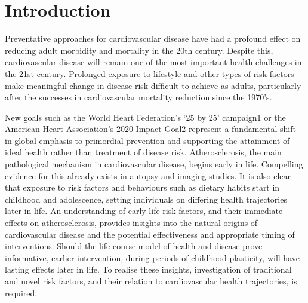 \section{Introduction}
Preventative approaches for cardiovascular disease have had a profound effect on reducing adult morbidity and mortality in the 20th century. Despite this, cardiovascular disease will remain one of the most important health challenges in the 21st century. Prolonged exposure to lifestyle and other types of risk factors make meaningful change in disease risk difficult to achieve as adults, particularly after the successes in cardiovascular mortality reduction since the 1970’s.

New goals such as the World Heart Federation’s ‘25 by 25’ campaign1 or the American Heart Association’s 2020 Impact Goal2 represent a fundamental shift in global emphasis to primordial prevention and supporting the attainment of ideal health rather than treatment of disease risk.
Atherosclerosis, the main pathological mechanism in cardiovascular disease, begins early in life. Compelling evidence for this already exists in autopsy and imaging studies. It is also clear that exposure to risk factors and behaviours such as dietary habits start in childhood and adolescence, setting individuals on differing health trajectories later in life. 
An understanding of early life risk factors, and their immediate effects on atherosclerosis, provides insights into the natural origins of cardiovascular disease and the potential effectiveness and appropriate timing of interventions. Should the life-course model of health and disease prove informative, earlier intervention, during periods of childhood plasticity, will have lasting effects later in life. To realise these insights, investigation of traditional and novel risk factors, and their relation to cardiovascular health trajectories, is required. 
